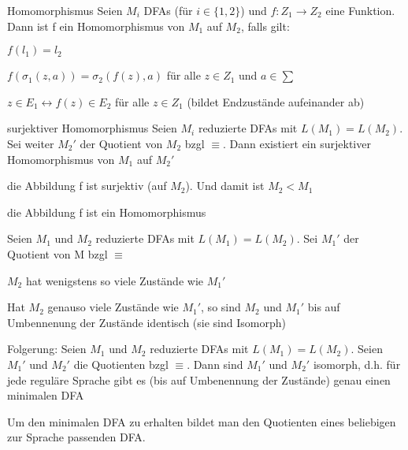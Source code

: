 \documentclass[avery5371, frame]{flashcards}
\begin{document}
\begin{flashcard}[Definition]{Homomorphismus}
    Seien $M_i$ DFAs (für $i\in\{1,2\}$) und $f:Z_1 \rightarrow Z_2$ eine Funktion. Dann ist f ein Homomorphismus von $M_1$ auf $M_2$, falls gilt:
    \begin{itemize*}
        \item $f(l_1)=l_2$
        \item $f(\sigma_1(z,a))=\sigma_2(f(z),a)$ für alle $z\in Z_1$ und $a\in \sum$
        \item $z\in E_1 \leftrightarrow f(z)\in E_2$ für alle $z\in Z_1$ (bildet Endzustände aufeinander ab)
    \end{itemize*}
\end{flashcard}

\begin{flashcard}[Satz]{surjektiver Homomorphismus}
    Seien $M_i$ reduzierte DFAs mit $L(M_1)=L(M_2)$. Sei weiter $M_2'$ der Quotient von $M_2$ bzgl $\equiv$. Dann existiert ein surjektiver Homomorphismus von $M_1$ auf $M_2'$
    \begin{itemize*}
        \item die Abbildung f ist surjektiv (auf $M_2$). Und damit ist $M_2 < M_1$
        \item die Abbildung f ist ein Homomorphismus
    \end{itemize*}
\end{flashcard}

\begin{flashcard}[Satz]{ Seien $M_1$ und $M_2$ reduzierte DFAs mit $L(M_1)=L(M_2)$. Sei $M_1'$ der Quotient von M bzgl $\equiv$}
    \small
    \begin{itemize*}
        \item $M_2$ hat wenigstens so viele Zustände wie $M_1'$
        \item Hat $M_2$ genauso viele Zustände wie $M_1'$, so sind $M_2$ und $M_1'$ bis auf Umbennenung der Zustände identisch (sie sind Isomorph)
    \end{itemize*}

    Folgerung: Seien $M_1$ und $M_2$ reduzierte DFAs mit $L(M_1)=L(M_2)$. Seien $M_1'$ und $M_2'$ die Quotienten bzgl $\equiv$. Dann sind $M_1'$ und $M_2'$ isomorph, d.h. für jede reguläre Sprache gibt es (bis auf Umbenennung der Zustände) genau einen minimalen DFA

    Um den minimalen DFA zu erhalten bildet man den Quotienten eines beliebigen zur Sprache passenden DFA.
\end{flashcard}
\end{document}
